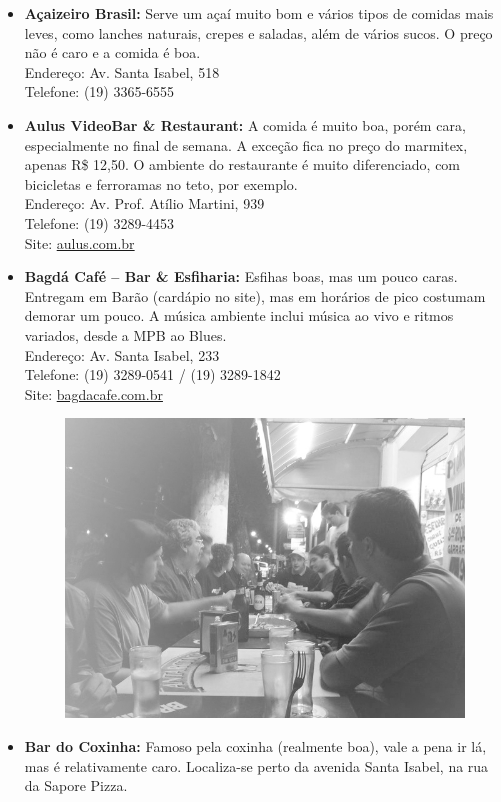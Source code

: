 \begin{itemize}
    \item   \textbf{Açaizeiro Brasil:} Serve um açaí muito bom e vários tipos de
        comidas mais leves, como lanches naturais, crepes e saladas, além de
        vários sucos. O preço não é caro e a comida é boa.
        \\Endereço: Av. Santa Isabel, 518
        \\Telefone: (19) 3365-6555 %

    \item   \textbf{Aulus VideoBar \& Restaurant:} A comida é muito boa, porém
        cara, especialmente no final de semana. A exceção fica no preço do
        marmitex, apenas R\$ 12,50. O ambiente do restaurante é muito diferenciado,
        com bicicletas e ferroramas no teto, por exemplo.
        \\Endereço: Av. Prof. Atílio Martini, 939
        \\Telefone: (19) 3289-4453
        \\Site: \url{aulus.com.br}

    \item   \textbf{Bagdá Café -- Bar \& Esfiharia:} Esfihas boas, mas um pouco
        caras. Entregam em Barão (cardápio no site), mas em horários de pico
        costumam demorar um pouco. A música ambiente inclui música ao vivo e
        ritmos variados, desde a MPB ao Blues.
        \\Endereço: Av. Santa Isabel, 233
        \\Telefone: (19) 3289-0541 / (19) 3289-1842
        \\Site: \url{bagdacafe.com.br}

\begin{figure}[h!]
    \centering
    \includegraphics[width=.45\textwidth]{img/barao/bar.jpg}
\end{figure}

    \item   \textbf{Bar do Coxinha:} Famoso pela coxinha (realmente boa), vale a
        pena ir lá, mas é relativamente caro. Localiza-se perto da avenida Santa
        Isabel, na rua da Sapore Pizza.


\end{itemize}
